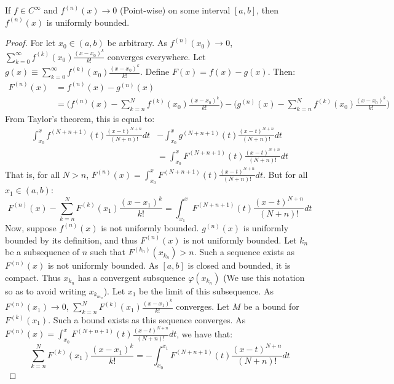     \begin{theorem}
    If $f\in C^{\infty}$ and $f^{(n)}(x)\rightarrow 0$ (Point-wise) on some interval $[a,b]$, then $f^{(n)}(x)$ is uniformly bounded.
    \end{theorem}
    \begin{proof}
    For let $x_0\in (a,b)$ be arbitrary. As $f^{(n)}(x_0)\rightarrow 0$, $\sum_{k=0}^{\infty} f^{(k)}(x_0)\frac{(x-x_0)^{k}}{k!}$ converges everywhere. Let $g(x)\equiv \sum_{k=0}^{\infty} f^{(k)}(x_0)\frac{(x-x_0)^{k}}{k!}$. Define $F(x) = f(x)-g(x)$. Then:
    \begin{align*}
        F^{(n)}(x) &= f^{(n)}(x)-g^{(n)}(x)\\
        &= \bigg(f^{(n)}(x)-\sum_{k=n}^{N} f^{(k)}(x_0)\frac{(x-x_0)^{k}}{k!}\bigg)-\bigg(g^{(n)}(x)-\sum_{k=n}^{N} f^{(k)}(x_0)\frac{(x-x_0)^{k}}{k!}\bigg)    
    \end{align*}
    From Taylor's theorem, this is equal to:
    \begin{align*}
        \int_{x_0}^{x} f^{(N+n+1)}(t)\frac{(x-t)^{N+n}}{(N+n)!}dt &- \int_{x_0}^{x} g^{(N+n+1)}(t)\frac{(x-t)^{N+n}}{(N+n)!}dt\\
        &= \int_{x_0}^{x} F^{(N+n+1)}(t)\frac{(x-t)^{N+n}}{(N+n)!}dt    
    \end{align*}
    That is, for all $N>n$, $F^{(n)}(x) = \int_{x_0}^{x} F^{(N+n+1)}(t)\frac{(x-t)^{N+n}}{(N+n)!}dt$. But for all $x_1 \in (a,b)$:
    \begin{equation*}
        F^{(n)}(x)-\sum_{k=n}^{N} F^{(k)}(x_1)\frac{(x-x_1)^k}{k!} = \int_{x_1}^{x} F^{(N+n+1)}(t)\frac{(x-t)^{N+n}}{(N+n)!}dt    
    \end{equation*}
    Now, suppose $f^{(n)}(x)$ is not uniformly bounded. $g^{(n)}(x)$ is uniformly bounded by its definition, and thus $F^{(n)}(x)$ is not uniformly bounded. Let ${k_n}$ be a subsequence of $n$ such that $F^{(k_n)}(x_{k_n})>n$. Such a sequence exists as $F^{(n)}(x)$ is not uniformly bounded. As $[a,b]$ is closed and bounded, it is compact. Thus $x_{k_n}$ has a convergent subsquence $\varphi(x_{k_n})$ (We use this notation so as to avoid writing $x_{k_{m_n}}$). Let $x_1$ be the limit of this subsequence. As $F^{(n)}(x_1)\rightarrow 0$, $\sum_{k=n}^{N} F^{(k)}(x_1)\frac{(x-x_1)^k}{k!}$ converges. Let $M$ be a bound for $F^{(k)}(x_1)$. Such a bound exists as this sequence converges. As $F^{(n)}(x) = \int_{x_0}^{x} F^{(N+n+1)}(t)\frac{(x-t)^{N+n}}{(N+n)!}dt$, we have that:
    \begin{equation*}
        \sum_{k=n}^{N} F^{(k)}(x_1)\frac{(x-x_1)^k}{k!} = -\int_{x_0}^{x_1} F^{(N+n+1)}(t)\frac{(x-t)^{N+n}}{(N+n)!}dt    

\end{equation*}
\end{proof}
